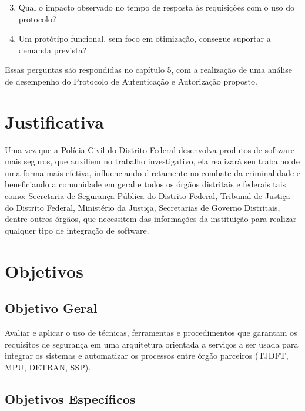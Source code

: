 \begin{enumerate}
\setcounter{enumi}{2}
  \item Qual o impacto observado no tempo de resposta às requisições com o uso do protocolo?
  \item Um protótipo funcional, sem foco em otimização, consegue suportar a demanda prevista?
\end{enumerate}  
  
Essas perguntas são respondidas no capítulo 5, com a realização de uma análise de desempenho do Protocolo de Autenticação e Autorização proposto.



\section{Justificativa}

Uma vez que a Polícia Civil do Distrito Federal desenvolva produtos de software mais seguros, que auxiliem no trabalho investigativo, ela realizará seu trabalho de uma forma mais efetiva, influenciando diretamente no combate da criminalidade e beneficiando a comunidade em geral e todos os órgãos distritais e federais tais como: Secretaria de Segurança Pública do Distrito Federal, Tribunal de Justiça do Distrito Federal, Ministério da Justiça, Secretarias de Governo Distritais, dentre outros órgãos, que necessitem das informações da instituição para realizar qualquer tipo de integração de software.

\section{Objetivos}\label{sec:Obj}
\subsection{Objetivo Geral}

Avaliar e aplicar o uso de técnicas, ferramentas  e procedimentos que garantam os requisitos de segurança em uma arquitetura orientada a serviços a ser usada para integrar os sistemas e automatizar os processos entre órgão parceiros (TJDFT, MPU, DETRAN, SSP).

\subsection{Objetivos Espec\'ificos}

